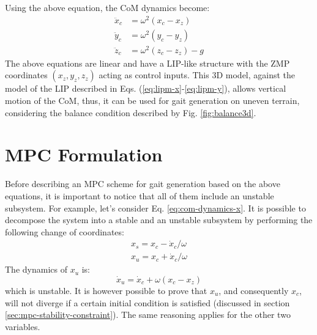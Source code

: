 Using the above equation, the CoM dynamics become:
\begin{align}
  \ddot{x}_c &= \omega^2 (x_c - x_z) \label{eq:com-dynamics-x} \\
  \ddot{y}_c &= \omega^2 (y_c - y_z) \label{eq:com-dynamics-y}\\
  \ddot{z}_c &= \omega^2 (z_c - z_z) - g \label{eq:com-dynamics-z}
\end{align}
The above equations are linear and have a LIP-like structure with the 
ZMP coordinates $(x_z, y_z, z_z)$ acting as control inputs. This 3D model,
against the model of the LIP described in Eqs.
(\ref{eq:lipm-x}-\ref{eq:lipm-y}), allows vertical motion of the CoM, thus,
it can be used for 
gait generation on uneven terrain, considering the balance condition 
described by Fig. \ref{fig:balance3d}.

\section{MPC Formulation}
Before describing an MPC scheme for gait generation based on the above 
equations, it is important to notice that all of them include an unstable 
subsystem. For example, let's consider Eq. \eqref{eq:com-dynamics-x}. It is 
possible to decompose the system into a stable and an unstable subsystem by 
performing the following change of coordinates:
\begin{align}
  x_s = x_c - \dot{x}_c / \omega \\
  x_u = x_c + \dot{x}_c / \omega
\end{align}
The dynamics of $x_u$ is:
\begin{equation}
  \dot{x}_u = \dot{x}_c + \omega (x_c - x_z)
\end{equation}
which is unstable. It is however possible to prove 
\cite{Lanari2014BoundednessII} that $x_u$, and consequently $x_c$, will not 
diverge if a certain initial condition is satisfied (discussed in section 
\ref{sec:mpc-stability-constraint}). The same 
reasoning applies for the other two variables.

